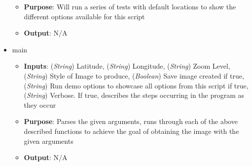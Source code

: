 \begin{itemize}
\begin{itemize}
        \item \textbf{Purpose}: Will run a series of tests with default locations to show the different options available for this script

        \item \textbf{Output}: N/A

    \end{itemize}

    \item main

    \begin{itemize}
        
        \item \textbf{Inputs}: (\textit{String}) Latitude, (\textit{String}) Longitude, (\textit{String}) Zoom Level, (\textit{String}) Style of Image to produce, (\textit{Boolean}) Save image created if true, (\textit{String}) Run demo options to showcase all options from this script if true, (\textit{String}) Verbose. If true, describes the steps occurring in the program as they occur

        \item \textbf{Purpose}: Parses the given arguments, runs through each of the above described functions to achieve the goal of obtaining the image with the given arguments

        \item \textbf{Output}: N/A

    \end{itemize}

\end{itemize}